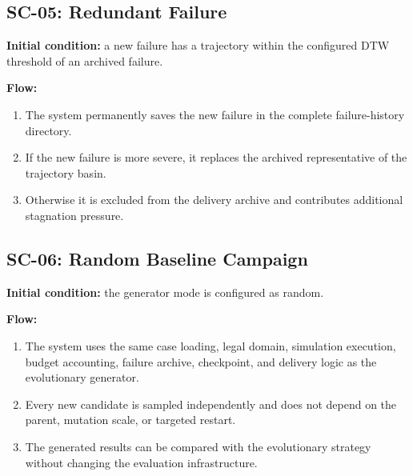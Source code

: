 \documentclass[11pt,a4paper,openany]{report}
\begin{document}
\subsection{SC-05: Redundant Failure}
\textbf{Initial condition:} a new failure has a trajectory within the configured DTW threshold of an archived failure.

\textbf{Flow:}
\begin{enumerate}
  \item The system permanently saves the new failure in the complete failure-history directory.
  \item If the new failure is more severe, it replaces the archived representative of the trajectory basin.
  \item Otherwise it is excluded from the delivery archive and contributes additional stagnation pressure.
\end{enumerate}

\subsection{SC-06: Random Baseline Campaign}
\textbf{Initial condition:} the generator mode is configured as random.

\textbf{Flow:}
\begin{enumerate}
  \item The system uses the same case loading, legal domain, simulation execution, budget accounting, failure archive, checkpoint, and delivery logic as the evolutionary generator.
  \item Every new candidate is sampled independently and does not depend on the parent, mutation scale, or targeted restart.
  \item The generated results can be compared with the evolutionary strategy without changing the evaluation infrastructure.
\end{enumerate}
\end{document}

